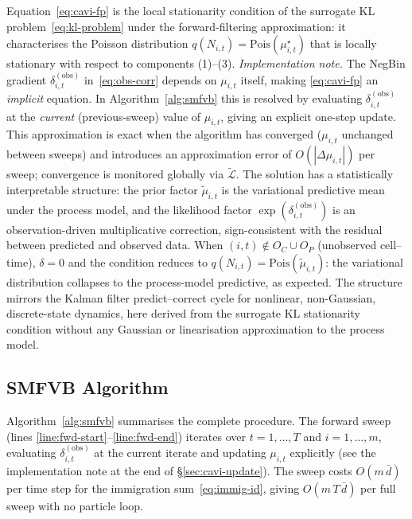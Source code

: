 \documentclass[review,12pt]{elsarticle}
\theoremstyle{definition}
\begin{document}
Equation~\eqref{eq:cavi-fp} is the local stationarity condition of the
surrogate KL problem~\eqref{eq:kl-problem} under the forward-filtering
approximation: it characterises the Poisson distribution $q(N_{i,t})=\mathrm{Pois}(\mu_{i,t}^\star)$
that is locally stationary with respect to components (1)--(3).
\emph{Implementation note.}  The NegBin gradient $\delta^{(\mathrm{obs})}_{i,t}$
in~\eqref{eq:obs-corr} depends on $\mu_{i,t}$ itself, making
\eqref{eq:cavi-fp} an \emph{implicit} equation.  In Algorithm~\ref{alg:smfvb}
this is resolved by evaluating $\delta_{i,t}^{(\mathrm{obs})}$ at the
\emph{current} (previous-sweep) value of $\mu_{i,t}$, giving an explicit
one-step update.  This approximation is exact when the algorithm has converged
($\mu_{i,t}$ unchanged between sweeps) and introduces an approximation error
of $O(|\Delta\mu_{i,t}|)$ per sweep; convergence is monitored globally via
$\tilde{\mathcal{L}}$.
The solution has a statistically
interpretable structure: the prior factor $\tilde\mu_{i,t}$ is the
variational predictive mean under the process model, and the likelihood factor
$\exp(\delta_{i,t}^{(\mathrm{obs})})$ is an observation-driven multiplicative
correction, sign-consistent with the residual between predicted and observed
data.  When $(i,t)\notin O_C\cup O_P$ (unobserved cell--time), $\delta=0$
and the condition reduces to $q(N_{i,t})=\mathrm{Pois}(\tilde\mu_{i,t})$:
the variational distribution collapses to the process-model predictive, as
expected.  The structure mirrors the Kalman filter predict--correct cycle
for nonlinear, non-Gaussian, discrete-state dynamics, here derived from
the surrogate KL stationarity condition without any Gaussian or linearisation
approximation to the process model.

\subsection{SMFVB Algorithm}
\label{sec:smfvb-alg}

Algorithm~\ref{alg:smfvb} summarises the complete procedure.
The forward sweep (lines \ref{line:fwd-start}--\ref{line:fwd-end}) iterates
over $t=1,\ldots,T$ and $i=1,\ldots,m$, evaluating $\delta_{i,t}^{(\mathrm{obs})}$
at the current iterate and updating $\mu_{i,t}$ explicitly
(see the implementation note at the end of \S\ref{sec:cavi-update}).
The sweep costs $O(m\,\bar{d})$ per time step for the immigration sum~\eqref{eq:immig-id},
giving $O(m\,T\,\bar{d})$ per full sweep with no particle loop.
\end{document}
